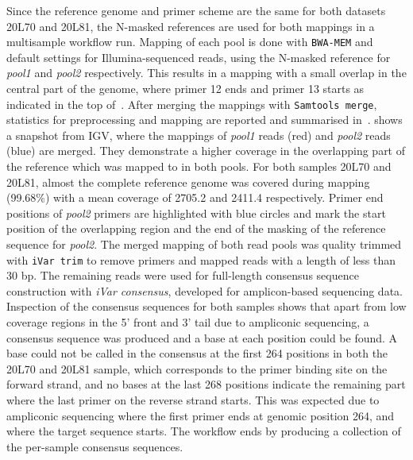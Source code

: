 Since the reference genome and primer scheme are the same for both datasets 20L70 and 20L81, the N-masked references are used for both mappings in a multisample workflow run. Mapping of each pool is done with \texttt{BWA-MEM} and default settings for Illumina-sequenced reads, using the N-masked reference for \textit{pool1} and \textit{pool2} respectively. This results in a mapping with a small overlap in the central part of the genome, where primer 12 ends and primer 13 starts as indicated in the top of~. After merging the mappings with \texttt{Samtools merge}, statistics for preprocessing and mapping are reported and summarised in~.  shows a snapshot from \ac{IGV}, where the mappings of \textit{pool1} reads (red) and \textit{pool2} reads (blue) are merged. They demonstrate a higher coverage in the overlapping part of the reference which was mapped to in both pools. For both samples 20L70 and 20L81, almost the complete reference genome was covered during mapping (99.68\%) with a mean coverage of {2705.2\texttimes } and {2411.4\texttimes } respectively. Primer end positions of \textit{pool2} primers are highlighted with blue circles and mark the start position of the overlapping region and the end of the masking of the reference sequence for \textit{pool2}. The merged mapping of both read pools was quality trimmed with \texttt{iVar trim} to remove primers and mapped reads with a length of less than 30 bp. The remaining reads were used for full-length consensus sequence construction with \textit{iVar consensus}, developed for amplicon-based sequencing data. Inspection of the consensus sequences for both samples shows that apart from low coverage regions in the 5' front and 3' tail due to ampliconic sequencing, a consensus sequence was produced and a base at each position could be found. A base could not be called in the consensus at the first 264 positions in both the 20L70 and 20L81 sample, which corresponds to the primer binding site on the forward strand, and no bases at the last 268 positions indicate the remaining part where the last primer on the reverse strand starts. This was expected due to ampliconic sequencing where the first primer ends at genomic position 264, and where the target sequence starts. The workflow ends by producing a collection of the per-sample consensus sequences.

